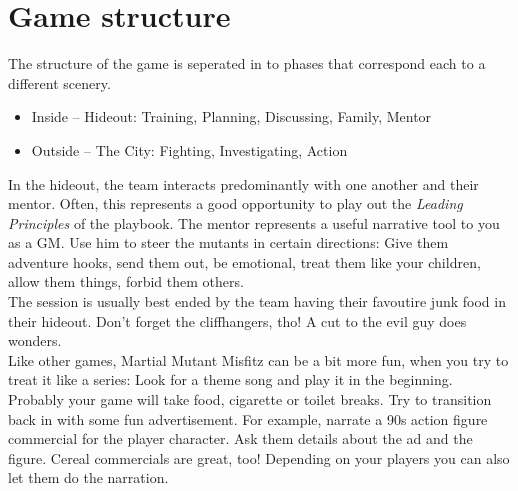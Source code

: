 \documentclass{book}
\begin{document}
\section*{Game structure}
The structure of the game is seperated in to phases that correspond each to a different scenery.
\begin{itemize}
    \item Inside -- Hideout: Training, Planning, Discussing, Family, Mentor
    \item Outside -- The City: Fighting, Investigating, Action
\end{itemize}
In the hideout, the team interacts predominantly with one another and their mentor. Often, this represents a good opportunity to play out the \emph{Leading Principles} of the playbook. The mentor represents a useful narrative tool to you as a GM. Use him to steer the mutants in certain directions: Give them adventure hooks, send them out, be emotional, treat them like your children, allow them things, forbid them others.\\
\medskip
The session is usually best ended by the team having their favoutire junk food in their hideout. Don't forget the cliffhangers, tho! A cut to the evil guy does wonders.\\
\medskip
Like other games, Martial Mutant Misfitz can be a bit more fun, when you try to treat it like a series: Look for a theme song and play it in the beginning. Probably your game will take food, cigarette or toilet breaks. Try to transition back in with some fun advertisement. For example, narrate a 90s action figure commercial for the player character. Ask them details about the ad and the figure. Cereal commercials are great, too! Depending on your players you can also let them do the narration.
\end{document}
